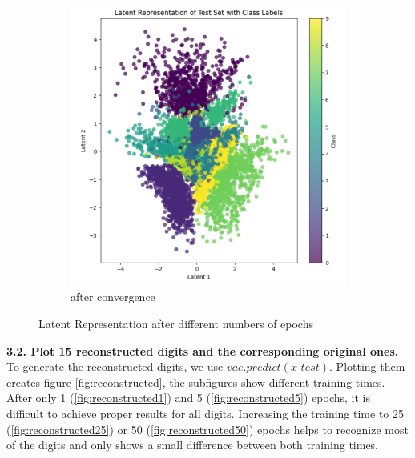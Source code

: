 \begin{figure}[H]\ContinuedFloat
    \centering
    \begin{subfigure}[b]{0.45\textwidth}
        \centering
        \includegraphics[width=\textwidth]{images/3-latentRepCon.png}
        \caption{after convergence}
        \label{fig:latentRepCon}
    \end{subfigure}
    \caption{Latent Representation after different numbers of epochs}
    \label{fig:latentRep2}
\end{figure}

\textbf{3.2. Plot 15 reconstructed digits and the corresponding original ones.} \\

To generate the reconstructed digits, we use \texttt{$vae.predict(x\_test)$}. Plotting them creates figure \ref{fig:reconstructed}, the subfigures show different training times. After only 1 (\ref{fig:reconstructed1}) and 5 (\ref{fig:reconstructed5}) epochs, it is difficult to achieve proper results for all digits. Increasing the training time to 25 (\ref{fig:reconstructed25}) or 50 (\ref{fig:reconstructed50}) epochs helps to recognize most of the digits and only shows a small difference between both training times. 

